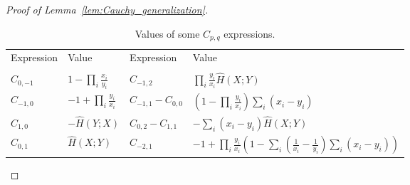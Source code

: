 \documentclass[10pt,a4paper]{amsart}
\begin{document}
\begin{proof}[Proof of Lemma~\ref{lem:Cauchy_generalization}]
\begin{table}
\begin{tabular}{ |p{1.7cm}|p{2.5cm}|p{1.8cm}|p{7.5cm}|  }
    \hline
    \rule{0pt}{0.6cm}
	Expression& Value &Expression&Value\\
	&&&\\
	\hline
	\rule{0pt}{0.6cm}$C_{0,-1}$   & $\displaystyle 1-\prod_i \frac{x_i}{y_i}$    &
	$C_{-1,2}$ &$\displaystyle \prod_i\frac{y_i}{x_i} \hat H(X;Y)$
	\\
    \hline
	\rule{0pt}{0.6cm}
	$C_{-1,0}$& $\displaystyle-1+ \prod_i \frac{y_i}{x_i}$&$C_{-1,1}-C_{0,0}$ & $\displaystyle \left(1-\prod_i\frac{y_i}{x_i}\right)\sum_i(x_i-y_i)$
	\\
	\hline
		\rule{0pt}{0.6cm}
	$C_{1,0}$ & $\displaystyle -\hat H(Y;X)$
	& 	$C_{0,2}-C_{1,1}$
	&$\displaystyle -\sum_i(x_i-y_i) \hat H(X;Y)$
	\\
	\hline
			\rule{0pt}{0.6cm}
			$C_{0,1}$& $\displaystyle \hat H(X;Y)$&$C_{-2,1}$& $\displaystyle -1 + \prod_i\frac{y_i}{x_i}\left( 1- \sum_i\left(\frac{1}{x_i}-\frac{1}{y_i}\right)\sum_i\left(x_i-y_i\right)\right)$\\
	\hline
\end{tabular}
\caption{\label{table:C}Values of some $C_{p,q}$ expressions.}
\end{table}



\end{proof}
\end{document}
